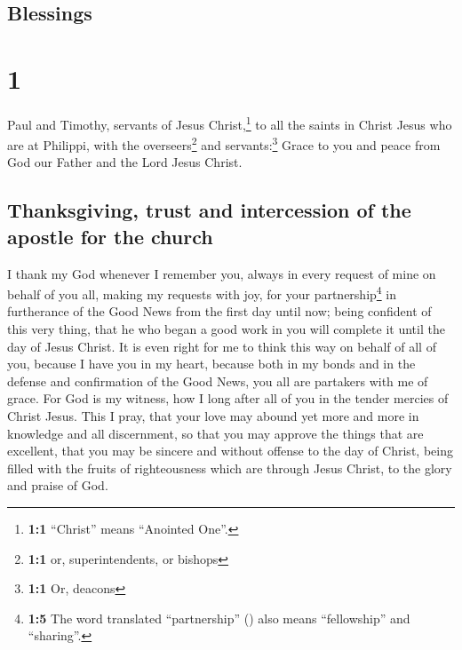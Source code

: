 \hypertarget{blessings}{%
\subsection{Blessings}\label{blessings}}

\hypertarget{section}{%
\section{1}\label{section}}

 Paul and Timothy, servants of Jesus Christ,\footnote{\textbf{1:1}
  ``Christ'' means ``Anointed One''.} to all the saints in Christ Jesus
who are at Philippi, with the overseers\footnote{\textbf{1:1} or,
  superintendents, or bishops} and servants:\footnote{\textbf{1:1} Or,
  deacons}  Grace to you and peace from God our Father and
the Lord Jesus Christ.

\hypertarget{thanksgiving-trust-and-intercession-of-the-apostle-for-the-church}{%
\subsection{Thanksgiving, trust and intercession of the apostle for the
church}\label{thanksgiving-trust-and-intercession-of-the-apostle-for-the-church}}

 I thank my God whenever I remember you, 
always in every request of mine on behalf of you all, making my requests
with joy,  for your partnership\footnote{\textbf{1:5} The
  word translated ``partnership'' () also means
  ``fellowship'' and ``sharing''.} in furtherance of the Good News from
the first day until now;  being confident of this very
thing, that he who began a good work in you will complete it until the
day of Jesus Christ.  It is even right for me to think
this way on behalf of all of you, because I have you in my heart,
because both in my bonds and in the defense and confirmation of the Good
News, you all are partakers with me of grace.  For God is
my witness, how I long after all of you in the tender mercies of Christ
Jesus.  This I pray, that your love may abound yet more
and more in knowledge and all discernment,  so that you
may approve the things that are excellent, that you may be sincere and
without offense to the day of Christ,  being filled with
the fruits of righteousness which are through Jesus Christ, to the glory
and praise of God.

